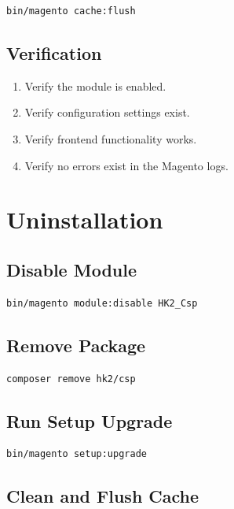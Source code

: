\documentclass[11pt,a4paper]{article}
\begin{document}
\begin{lstlisting}[style=shell]
bin/magento cache:flush
\end{lstlisting}

\subsection{Verification}

\begin{enumerate}
    \item Verify the module is enabled.
    \item Verify configuration settings exist.
    \item Verify frontend functionality works.
    \item Verify no errors exist in the Magento logs.
\end{enumerate}

\section{Uninstallation}

\subsection{Disable Module}

\begin{lstlisting}[style=shell]
bin/magento module:disable HK2_Csp
\end{lstlisting}

\subsection{Remove Package}

\begin{lstlisting}[style=shell]
composer remove hk2/csp
\end{lstlisting}

\subsection{Run Setup Upgrade}

\begin{lstlisting}[style=shell]
bin/magento setup:upgrade
\end{lstlisting}

\subsection{Clean and Flush Cache}
\end{document}
